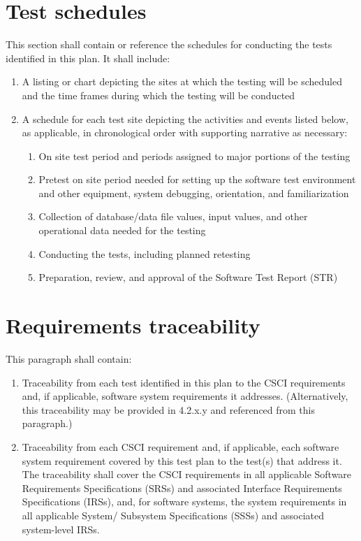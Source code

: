 \documentclass{fidata-report-template}
\begin{document}
\section{Test schedules}

This section shall contain or reference the schedules for conducting the
tests identified in this plan. It shall include:

\begin{enumerate}
\itemsep1pt\parskip0pt
\item
  A listing or chart depicting the sites at which the testing will be
  scheduled and the time frames during which the testing will be
  conducted
\item
  A schedule for each test site depicting the activities and events
  listed below, as applicable, in chronological order with supporting
  narrative as necessary:

  \begin{enumerate}
  \itemsep1pt\parskip0pt
  \item
    On site test period and periods assigned to major portions of the
    testing
  \item
    Pretest on site period needed for setting up the software test
    environment and other equipment, system debugging, orientation, and
    familiarization
  \item
    Collection of database/data file values, input values, and other
    operational data needed for the testing
  \item
    Conducting the tests, including planned retesting
  \item
    Preparation, review, and approval of the Software Test Report (STR)
  \end{enumerate}
\end{enumerate}

\section{Requirements traceability}

This paragraph shall contain:

\begin{enumerate}
\itemsep1pt\parskip0pt
\item
  Traceability from each test identified in this plan to the CSCI
  requirements and, if applicable, software system requirements it
  addresses. (Alternatively, this traceability may be provided in
  4.2.x.y and referenced from this paragraph.)
\item
  Traceability from each CSCI requirement and, if applicable, each
  software system requirement covered by this test plan to the test(s)
  that address it. The traceability shall cover the CSCI requirements in
  all applicable Software Requirements Specifications (SRSs) and
  associated Interface Requirements Specifications (IRSs), and, for
  software systems, the system requirements in all applicable System/
  Subsystem Specifications (SSSs) and associated system-level IRSs.
\end{enumerate}
\end{document}
